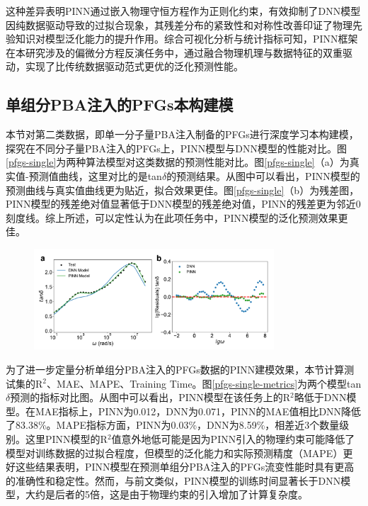 这种差异表明PINN通过嵌入物理守恒方程作为正则化约束，有效抑制了DNN模型因纯数据驱动导致的过拟合现象，其残差分布的紧致性和对称性改善印证了物理先验知识对模型泛化能力的提升作用。综合可视化分析与统计指标可知，PINN框架在本研究涉及的偏微分方程反演任务中，通过融合物理机理与数据特征的双重驱动，实现了比传统数据驱动范式更优的泛化预测性能。
\subsection{单组分PBA注入的PFGs本构建模}
本节对第二类数据，即单一分子量PBA注入制备的PFGs进行深度学习本构建模，探究在不同分子量PBA注入的PFGs上，PINN模型与DNN模型的性能对比。图\ref{pfgs-single}为两种算法模型对这类数据的预测性能对比。图\ref{pfgs-single}（a）为真实值-预测值曲线，这里对比的是tan$\delta$的预测结果。从图中可以看出，PINN模型的预测曲线与真实值曲线更为贴近，拟合效果更佳。图\ref{pfgs-single}（b）为残差图，PINN模型的残差绝对值显著低于DNN模型的残差绝对值，PINN的残差更为邻近0刻度线。综上所述，可以定性认为在此项任务中，PINN模型的泛化预测效果更佳。
\begin{figure}[htbp]
  \centering
  \includegraphics[width=0.8\textwidth]{Fig/pfgs-single.pdf}
\end{figure}
为了进一步定量分析单组分PBA注入的PFGs数据的PINN建模效果，本节计算测试集的R$^2$、MAE、MAPE、Training Time。图\ref{pfgs-single-metrics}为两个模型tan$\delta$预测的指标对比图。从图中可以看出，PINN模型在该任务上的R$^2$略低于DNN模型。在MAE指标上，PINN为0.012，DNN为0.071，PINN的MAE值相比DNN降低了83.38\%。MAPE指标方面，PINN为0.03\%，DNN为8.59\%，相差近3个数量级别。这里PINN模型的R$^2$值意外地低可能是因为PINN引入的物理约束可能降低了模型对训练数据的过拟合程度，但模型的泛化能力和实际预测精度（MAPE）更好这些结果表明，PINN模型在预测单组分PBA注入的PFGs流变性能时具有更高的准确性和稳定性。然而，与前文类似，PINN模型的训练时间显著长于DNN模型，大约是后者的5倍，这是由于物理约束的引入增加了计算复杂度。
